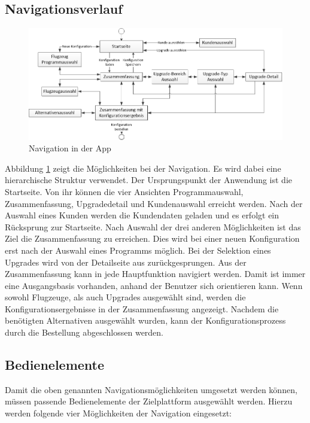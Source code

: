 \subsection{Navigationsverlauf}
\begin{figure}[H]
\centering
\includegraphics[width=\hsize]{images/workflow_navigation}
\caption{Navigation in der App}
\label{appNavigation}
\end{figure}
Abbildung \ref{appNavigation} zeigt die Möglichkeiten bei der Navigation. Es wird dabei eine hierarchische Struktur verwendet. Der Ursprungspunkt der Anwendung ist die Startseite. Von ihr können die vier Ansichten Programmauswahl, Zusammenfassung, Upgradedetail und Kundenauswahl erreicht werden.  Nach der Auswahl eines Kunden werden die Kundendaten geladen und es erfolgt ein Rücksprung zur Startseite. Nach Auswahl der drei anderen Möglichkeiten ist das Ziel die Zusammenfassung zu erreichen. Dies wird bei einer neuen Konfiguration erst nach der Auswahl eines Programms möglich. Bei der Selektion eines Upgrades wird von der Detailseite aus zurückgesprungen. Aus der Zusammenfassung kann in jede Hauptfunktion navigiert werden. Damit ist immer eine Ausgangsbasis vorhanden, anhand der Benutzer sich orientieren kann. Wenn sowohl Flugzeuge, als auch Upgrades ausgewählt sind, werden die Konfigurationsergebnisse in der Zusammenfassung angezeigt. Nachdem die benötigten Alternativen ausgewählt wurden, kann der Konfigurationsprozess durch die Bestellung abgeschlossen werden.
 
\subsection{Bedienelemente}
Damit die oben genannten Navigationsmöglichkeiten umgesetzt werden können, müssen passende Bedienelemente der Zielplattform ausgewählt werden. Hierzu werden folgende vier Möglichkeiten der Navigation eingesetzt: \par

